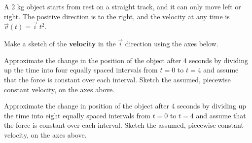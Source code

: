 \begin{problem}
\item A 2 kg object starts from rest on a straight track, and it can
  only move left or right. The positive direction is to the right, and
  the velocity at any time is $\vec{v}(t)=\vec{i} \; t^2$.

  \begin{subproblem}
    \item Make a sketch of the \textbf{velocity} in the $\vec{i}$
      direction using the axes below.



      \item Approximate the change in the position of the object after
        4 seconds by dividing up the time into four equally spaced
        intervals from $t=0$ to $t=4$ and assume that the force is
        constant over each interval. Sketch the assumed, piecewise
        constant velocity, on the axes above.

        \vfill
        
      \item Approximate the change in position of the object after 4
        seconds by dividing up the time into eight equally spaced
        intervals from $t=0$ to $t=4$ and assume that the force is
        constant over each interval. Sketch the assumed, piecewise
        constant velocity, on the axes above.


\end{subproblem}
\end{problem}
